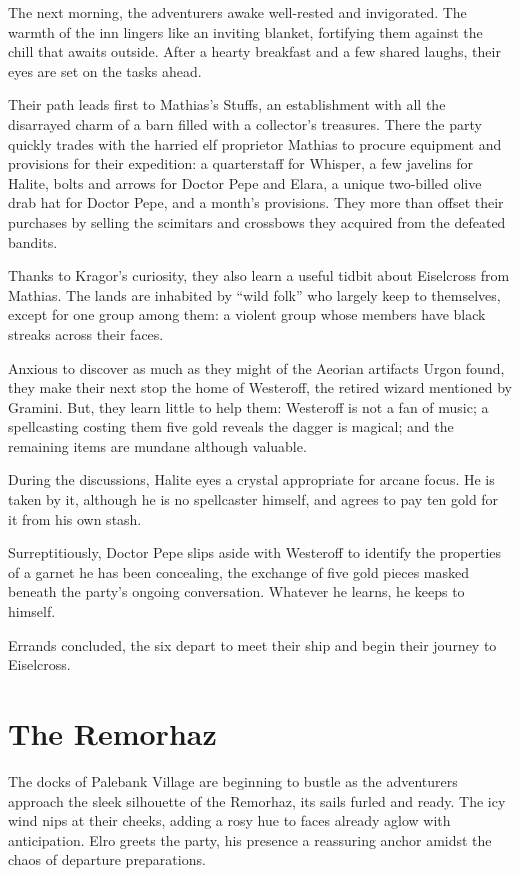 \documentclass[
  letterpaper,12pt,twoside,twocolumn,openany,
  nodeprecatedcode,bg=full]{dndbook}
\begin{document}
The next morning, the adventurers awake well-rested and invigorated. The
warmth of the inn lingers like an inviting blanket, fortifying them
against the chill that awaits outside. After a hearty breakfast and a
few shared laughs, their eyes are set on the tasks ahead.

Their path leads first to Mathias's Stuffs, an establishment with all
the disarrayed charm of a barn filled with a collector's treasures.
There the party quickly trades with the harried elf proprietor Mathias
to procure equipment and provisions for their expedition: a quarterstaff
for Whisper, a few javelins for Halite, bolts and arrows for Doctor Pepe
and Elara, a unique two-billed olive drab hat for Doctor Pepe, and a
month's provisions. They more than offset their purchases by selling the
scimitars and crossbows they acquired from the defeated bandits.

Thanks to Kragor's curiosity, they also learn a useful tidbit about
Eiselcross from Mathias. The lands are inhabited by ``wild folk'' who
largely keep to themselves, except for one group among them: a violent
group whose members have black streaks across their faces.

Anxious to discover as much as they might of the Aeorian artifacts Urgon
found, they make their next stop the home of Westeroff, the retired
wizard mentioned by Gramini. But, they learn little to help them:
Westeroff is not a fan of music; a spellcasting costing them five gold
reveals the dagger is magical; and the remaining items are mundane
although valuable.

During the discussions, Halite eyes a crystal appropriate for arcane
focus. He is taken by it, although he is no spellcaster himself, and
agrees to pay ten gold for it from his own stash.

Surreptitiously, Doctor Pepe slips aside with Westeroff to identify the
properties of a garnet he has been concealing, the exchange of five gold
pieces masked beneath the party's ongoing conversation. Whatever he
learns, he keeps to himself.

Errands concluded, the six depart to meet their ship and begin their
journey to Eiselcross.

\section{The Remorhaz}\label{the-remorhaz}

The docks of Palebank Village are beginning to bustle as the adventurers
approach the sleek silhouette of the Remorhaz, its sails furled and
ready. The icy wind nips at their cheeks, adding a rosy hue to faces
already aglow with anticipation. Elro greets the party, his presence a
reassuring anchor amidst the chaos of departure preparations.
\end{document}
